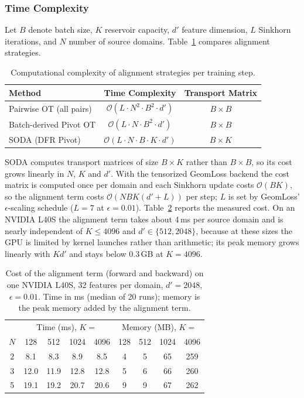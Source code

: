\subsubsection{Time Complexity}

Let $B$ denote batch size, $K$ reservoir capacity, $d'$ feature dimension, $L$ Sinkhorn iterations, and $N$ number of source domains. Table~\ref{tab:complexity} compares alignment strategies.

\begin{table}[t]
\caption{Computational complexity of alignment strategies per training step.}
\label{tab:complexity}
\centering
\small
\begin{tabular}{lcc}
\toprule
\textbf{Method} & \textbf{Time Complexity} & \textbf{Transport Matrix} \\
\midrule
Pairwise OT (all pairs) & $\mathcal{O}(L \cdot N^2 \cdot B^2 \cdot d')$ & $B \times B$ \\
Batch-derived Pivot OT & $\mathcal{O}(L \cdot N \cdot B^2 \cdot d')$ & $B \times B$ \\
SODA (DFR Pivot) & $\mathcal{O}(L \cdot N \cdot B \cdot K \cdot d')$ & $B \times K$ \\
\bottomrule
\end{tabular}
\end{table}

SODA computes transport matrices of size $B \times K$ rather than $B \times B$, so its cost grows linearly in $N$, $K$ and $d'$. With the tensorized GeomLoss backend the cost matrix is computed once per domain and each Sinkhorn update costs $\mathcal O(BK)$, so the alignment term costs $\mathcal O(NBK(d'+L))$ per step; $L$ is set by GeomLoss' $\epsilon$-scaling schedule ($L=7$ at $\epsilon=0.01$). Table~\ref{tab:scalability} reports the measured cost. On an NVIDIA L40S the alignment term takes about 4\,ms per source domain and is nearly independent of $K\le4096$ and $d'\in\{512,2048\}$, because at these sizes the GPU is limited by kernel launches rather than arithmetic; its peak memory grows linearly with $K d'$ and stays below 0.3\,GB at $K=4096$.

\begin{table}[t]
\caption{Cost of the alignment term (forward and backward) on one NVIDIA L40S, 32 features per domain, $d'=2048$, $\epsilon=0.01$. Time in ms (median of 20 runs); memory is the peak memory added by the alignment term.}
\label{tab:scalability}
\centering
\small
\begin{tabular}{c|cccc|cccc}
\toprule
 & \multicolumn{4}{c|}{Time (ms), $K=$} & \multicolumn{4}{c}{Memory (MB), $K=$} \\
$N$ & 128 & 512 & 1024 & 4096 & 128 & 512 & 1024 & 4096 \\
\midrule
2 & 8.1 & 8.3 & 8.9 & 8.5 & 4 & 5 & 65 & 259 \\
3 & 12.0 & 11.9 & 12.8 & 12.8 & 5 & 6 & 66 & 260 \\
5 & 19.1 & 19.2 & 20.7 & 20.6 & 9 & 9 & 67 & 262 \\
\bottomrule
\end{tabular}
\end{table}

